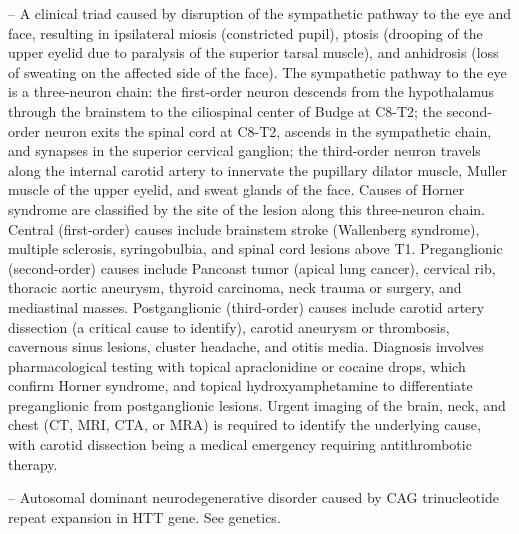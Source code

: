 -- A clinical triad caused by disruption of the sympathetic pathway to the eye and face, resulting in ipsilateral miosis (constricted pupil), ptosis (drooping of the upper eyelid due to paralysis of the superior tarsal muscle), and anhidrosis (loss of sweating on the affected side of the face). The sympathetic pathway to the eye is a three-neuron chain: the first-order neuron descends from the hypothalamus through the brainstem to the ciliospinal center of Budge at C8-T2; the second-order neuron exits the spinal cord at C8-T2, ascends in the sympathetic chain, and synapses in the superior cervical ganglion; the third-order neuron travels along the internal carotid artery to innervate the pupillary dilator muscle, Muller muscle of the upper eyelid, and sweat glands of the face. Causes of Horner syndrome are classified by the site of the lesion along this three-neuron chain. Central (first-order) causes include brainstem stroke (Wallenberg syndrome), multiple sclerosis, syringobulbia, and spinal cord lesions above T1. Preganglionic (second-order) causes include Pancoast tumor (apical lung cancer), cervical rib, thoracic aortic aneurysm, thyroid carcinoma, neck trauma or surgery, and mediastinal masses. Postganglionic (third-order) causes include carotid artery dissection (a critical cause to identify), carotid aneurysm or thrombosis, cavernous sinus lesions, cluster headache, and otitis media. Diagnosis involves pharmacological testing with topical apraclonidine or cocaine drops, which confirm Horner syndrome, and topical hydroxyamphetamine to differentiate preganglionic from postganglionic lesions. Urgent imaging of the brain, neck, and chest (CT, MRI, CTA, or MRA) is required to identify the underlying cause, with carotid dissection being a medical emergency requiring antithrombotic therapy.

-- Autosomal dominant neurodegenerative disorder caused by CAG trinucleotide repeat expansion in HTT gene. See genetics.

